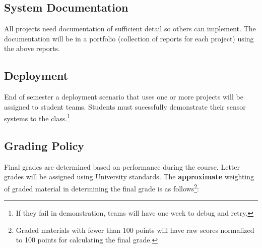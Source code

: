 \documentclass[12pt]{article}
\begin{document}
\subsection*{System Documentation}
All projects need documentation of sufficient detail so others can implement.  
The documentation will be in a portfolio (collection of reports for each project) using the above reports.


\subsection*{Deployment}
End of semester a deployment scenario that uses one or more projects will be assigned to student teams.  
Students must sucessfully demonstrate their sensor systems to the class.\footnote{If they fail in demonstration, teams will have one week to debug and retry.}
\subsection*{Grading Policy}
Final grades are determined based on performance during the course.
Letter grades will be assigned using University standards.  
The \textbf{approximate} weighting of graded material in determining the final grade is as follows\footnote{Graded materials with fewer than 100 points will have raw scores normalized to 100 points for calculating the final grade.}:
\end{document}

